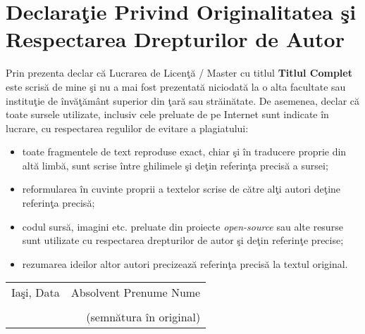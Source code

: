 
\newpage
\thispagestyle{empty}

\section*{Declara\c tie Privind Originalitatea \c si Respectarea Drepturilor de Autor}

\noindent Prin prezenta declar c\u a Lucrarea de Licen\c t\u a / Master cu titlul \textbf{Titlul Complet} este scris\u a de mine \c si nu a mai fost prezentat\u a niciodat\u a la o alta facultate sau institu\c tie de \^inv\u a\c t\u am\^ant superior din \c tar\u a sau str\u ain\u atate. De asemenea, declar c\u a toate sursele utilizate, inclusiv cele preluate de pe Internet sunt indicate \^in lucrare, cu respectarea regulilor de evitare a plagiatului:

\begin{itemize}
	\item toate fragmentele de text reproduse exact, chiar \c si \^in traducere proprie din alt\u a limb\u a, sunt scrise \^intre ghilimele \c si de\c tin referin\c ta precis\u a a sursei;
	\item reformularea \^in cuvinte proprii a textelor scrise de c\u atre al\c ti autori de\c tine referin\c ta precis\u a;
	\item codul surs\u a, imagini etc. preluate din proiecte \textit{open-source} sau alte resurse sunt utilizate cu respectarea drepturilor de autor \c si de\c tin referin\c te precise;
	\item rezumarea ideilor altor autori precizeaz\u a referin\c ta precis\u a la textul original.
\end{itemize}

\vspace{10 mm}

\noindent\begin{tabular}{p{8cm}r}
Ia\c si, Data & Absolvent Prenume Nume\\[8ex]
	 & \makebox[2.5in]{\hrulefill}\\
 & (semn\u atura \^in original)\\%

\end{tabular}


\newpage
\thispagestyle{empty}

